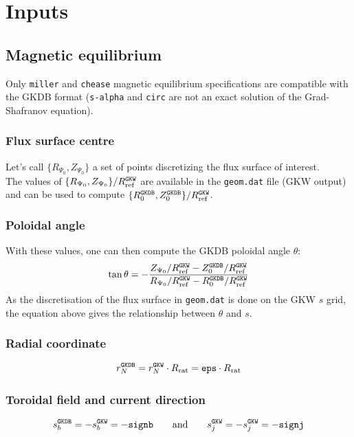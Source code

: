 \documentclass[a4paper]{report}
\begin{document}
\chapter{Inputs}
\section{Magnetic equilibrium} \label{sec:magequil}
Only \texttt{miller} and \texttt{chease} magnetic equilibrium specifications are compatible with the GKDB format (\texttt{s-alpha} and \texttt{circ} are not an exact solution of the Grad-Shafranov equation).
\subsection{Flux surface centre}
Let's call $\{R_{\Psi_0},Z_{\Psi_0}\}$ a set of points discretizing the flux surface of interest.\\
The values of $\{R_{\Psi_0},Z_{\Psi_0}\}/R_{\textrm{ref}}^{\texttt{GKW}}$ are available in the \texttt{geom.dat} file (GKW output) and can be used to compute $\{R_0^{\texttt{GKDB}},Z_0^{\texttt{GKDB}}\}/R_{\textrm{ref}}^{\texttt{GKW}}$. 

\subsection{Poloidal angle}
With these values, one can then compute the GKDB poloidal angle $\theta$:
\begin{equation}
 \tan \theta = - \frac{Z_{\Psi_0}/R_{\textrm{ref}}^{\texttt{GKW}}-Z_0^{\texttt{GKDB}}/R_{\textrm{ref}}^{\texttt{GKW}}}{R_{\Psi_0}/R_{\textrm{ref}}^{\texttt{GKW}}-R_0^{\texttt{GKDB}}/R_{\textrm{ref}}^{\texttt{GKW}}}
\end{equation}
As the discretisation of the flux surface in \texttt{geom.dat} is done on the GKW $s$ grid, the equation above gives the relationship between $\theta$ and $s$.

\subsection{Radial coordinate}
\begin{equation}
r_N^{\texttt{GKDB}} = r_N^{\texttt{GKW}} \cdot R_\textrm{rat}= \texttt{eps}\cdot R_\textrm{rat}
\end{equation}

\subsection{Toroidal field and current direction}
\begin{equation}
 s_b^{\texttt{GKDB}} = - s_b^{\texttt{GKW}}=-\texttt{signb} \qquad \textrm{and} \qquad s_j^{\texttt{GKW}}=-s_j^{\texttt{GKW}}=-\texttt{signj}
\end{equation}
\end{document}
